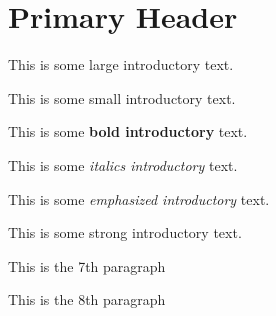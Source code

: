 \documentclass[12pt]{article}
\begin{document}
\section{Primary Header}This is some {\Large large introductory} text.

This is some {\scriptsize small introductory} text.

This is some \textbf{bold introductory} text.

This is some \textit{italics introductory} text.

This is some \emph{emphasized introductory} text.

This is some \textmd{strong introductory} text.

This is the 7th paragraph

This is the 8th paragraph
\end{document}
